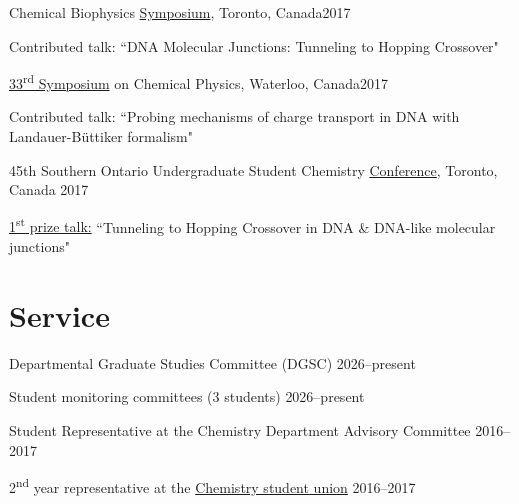 \documentclass[margin,line]{res}
\newenvironment{list1}{
  \begin{list}{\ding{113}}{%
      \setlength{\itemsep}{0in}
      \setlength{\parsep}{0in} \setlength{\parskip}{0in}
      \setlength{\topsep}{0in} \setlength{\partopsep}{0in} 
      \setlength{\leftmargin}{0.17in}}}{\end{list}}
\begin{document}
\begin{resume}
Chemical Biophysics \href{www.chembiophys.ca}{Symposium}, Toronto, Canada\hfill{2017}

\begin{list1}
\item[]Contributed talk: ``DNA Molecular Junctions:  Tunneling to Hopping Crossover"
\end{list1}

\vspace*{-1mm}

\href{http://scp.uwaterloo.ca}{33\textsuperscript{rd} Symposium} on Chemical Physics, Waterloo, Canada\hfill{2017}

\begin{list1}
\item[]Contributed talk: ``Probing mechanisms of charge transport in DNA with Landauer-B\"uttiker formalism"
\end{list1}

\vspace*{-1mm}

45th Southern Ontario Undergraduate Student Chemistry \href{https://sites.google.com/view/souscc52/home}{Conference}, Toronto, Canada \hfill{2017}

\begin{list1}
\item[]\underline{1\textsuperscript{st} prize talk:}  ``Tunneling to Hopping Crossover in DNA \& DNA-like molecular junctions"
\end{list1}

\section{\sc Service}

Departmental Graduate Studies Committee (DGSC) \hfill{2026--present}

\vspace*{-1mm}

Student monitoring committees (3 students) \hfill{2026--present}

\vspace*{-1mm}

Student Representative at the Chemistry Department Advisory Committee \hfill{2016--2017}

\vspace*{-1mm}

2\textsuperscript{nd} year representative at the \href{https://csu.sa.utoronto.ca/events-2013-2014/previous-executive-teams/exceutive-team-2015-2016/}{Chemistry student union} \hfill{2016--2017}


\end{resume}
\end{document}
